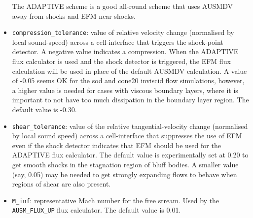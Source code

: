 \begin{itemize}
  The ADAPTIVE scheme is a good all-round scheme that uses AUSMDV away from
  shocks and EFM near shocks.
\item \texttt{compression\_tolerance}: value of relative velocity change (normalised by local sound-speed)
   across a cell-interface that triggers the shock-point detector.  A negative value indicates a compression.
   When the ADAPTIVE flux calculator is used and the shock detector is triggered, the EFM flux calculation
   will be used in place of the default AUSMDV calculation.
   A value of -0.05 seems OK for the sod and cone20 inviscid flow simulations, however,
   a higher value is needed for cases with viscous boundary layers, 
   where it is important to not have too much dissipation in the boundary layer region.
   The default value is -0.30.
\item \texttt{shear\_tolerance}: value of the relative tangential-velocity change 
   (normalised by local sound speed) across a cell-interface that suppresses the use of EFM even if the
   shock detector indicates that EFM should be used for the ADAPTIVE flux calculator.
   The default value is experimentally set at 0.20 to get smooth shocks
   in the stagnation region of bluff bodies.
   A smaller value (say, 0.05) may be needed to get strongly expanding flows to behave 
   when regions of shear are also present.
\item \verb!M_inf!: representative Mach number for the free stream.
   Used by the \verb!AUSM_FLUX_UP! flux calculator. The default value is 0.01.
\end{itemize}

